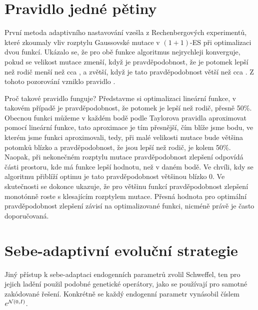 \newcommand{\fifth}{\sfrac{1}{5}\xspace}

\section{Pravidlo jedné pětiny}

První metoda adaptivního nastavování vzešla z Rechenbergových experimentů,\cite{rechenberg1973} které zkoumaly vliv rozptylu Gaussovské mutace v $(1+1)$-ES při optimalizaci dvou funkcí. Ukázalo se, že pro obě funkce algoritmus nejrychleji konverguje, pokud se velikost mutace zmenší, když je pravděpodobnost, že je potomek lepší než rodič menší než cca \fifth, a zvětší, když je tato pravděpodobnost větší než cca \fifth. Z tohoto pozorování vzniklo pravidlo \fifth.

Proč takové pravidlo funguje? Představme si optimalizaci lineární funkce, v takovém případě je pravděpodobnost, že potomek je lepší než rodič, přesně 50\%. 
Obecnou funkci můžeme v každém bodě podle Taylorova pravidla aproximovat pomocí lineární funkce, tato aproximace je tím přesnější, čím blíže jsme bodu, ve kterém jsme funkci aproximovali, tedy, při malé velikosti mutace bude většina potomků blízko a pravděpodobnost, že jsou lepší než rodič, je kolem 50\%. Naopak, při nekonečném rozptylu mutace pravděpodobnost zlepšení odpovídá části prostoru, kde má funkce lepší hodnotu, než v daném bodě. Ve chvíli, kdy se algoritmu přiblíží optimu je tato pravděpodobnost většinou blízko 0. Ve skutečnosti se dokonce ukazuje, že pro většinu funkcí pravděpodobnost zlepšení monotónně roste s klesajícím rozptylem mutace. Přesná hodnota pro optimální pravděpodobnost zlepšení závisí na optimalizované funkci, nicméně právě \fifth je často doporučovaná.

\section{Sebe-adaptivní evoluční strategie}

Jiný přístup k sebe-adaptaci endogenních parametrů zvolil Schweffel\cite{schwefel1977numerische}, ten pro jejich ladění použil podobné genetické operátory, jako se používají pro samotné zakódované řešení. Konkrétně se každý endogenní parametr vynásobil číslem $e^{\mathcal{N}(0, I)}$.